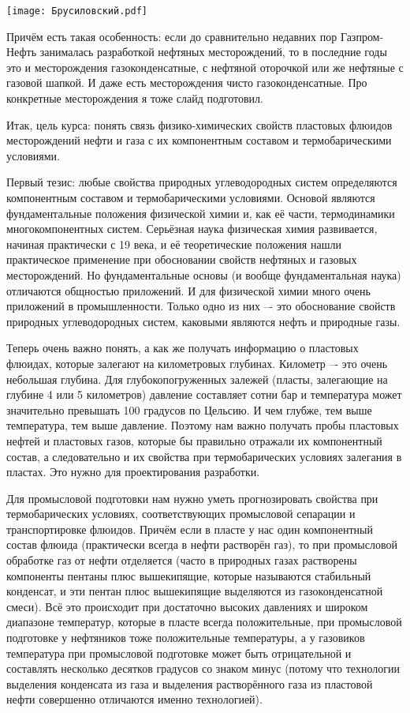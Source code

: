 \documentclass[main.tex]{subfiles}
\begin{document}
\begin{center}
\texttt{[image: Брусиловский.pdf]}
\end{center}

Причём есть такая особенность: если до сравнительно недавних пор Газпром-Нефть занималась разработкой нефтяных месторождений, то в последние годы это и месторождения газоконденсатные, с нефтяной оторочкой или же нефтяные с газовой шапкой.
И даже есть месторождения чисто газоконденсатные.
Про конкретные месторождения я тоже слайд подготовил.

Итак, цель курса: понять связь физико-химических свойств пластовых флюидов месторождений нефти и газа с их компонентным составом и термобарическими условиями.

Первый тезис: любые свойства природных углеводородных систем определяются компонентным составом и термобарическими условиями.
Основой являются фундаментальные положения физической химии и, как её части, термодинамики многокомпонентных систем.
Серьёзная наука физическая химия развивается, начиная практически с 19 века, и её теоретические положения нашли практическое применение при обосновании свойств нефтяных и газовых месторождений.
Но фундаментальные основы (и вообще фундаментальная наука) отличаются общностью приложений.
И для физической химии много очень приложений в промышленности.
Только одно из них –- это обоснование свойств природных углеводородных систем, каковыми являются нефть и природные газы.

Теперь очень важно понять, а как же получать информацию о пластовых флюидах, которые залегают на километровых глубинах.
Километр –- это очень небольшая глубина.
Для глубокопогруженных залежей (пласты, залегающие на глубине 4 или 5 километров) давление составляет сотни бар и температура может значительно превышать 100 градусов по Цельсию.
И чем глубже, тем выше температура, тем выше давление.
Поэтому нам важно получать пробы пластовых нефтей и пластовых газов, которые бы правильно отражали их компонентный состав, а следовательно и их свойства при термобарических условиях залегания в пластах.
Это нужно для проектирования разработки.

Для промысловой подготовки нам нужно уметь прогнозировать свойства при термобарических условиях, соответствующих промысловой сепарации и транспортировке флюидов.
Причём если в пласте у нас один компонентный состав флюида (практически всегда в нефти растворён газ), то при промысловой обработке газ от нефти отделяется (часто в природных газах растворены компоненты пентаны плюс вышекипящие, которые называются стабильный конденсат, и эти пентан плюс вышекипящие выделяются из газоконденсатной смеси).
Всё это происходит при достаточно высоких давлениях и широком диапазоне температур, которые в пласте всегда положительные, при промысловой подготовке у нефтяников тоже положительные температуры, а у газовиков температура при промысловой подготовке может быть отрицательной и составлять несколько десятков градусов со знаком минус (потому что технологии выделения конденсата из газа и выделения растворённого газа из пластовой нефти совершенно отличаются именно технологией).
\end{document}
